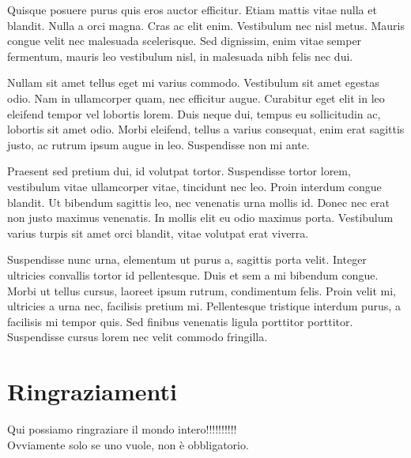 \documentclass[12pt,a4paper,openright,twoside]{report}
\begin{document}
Quisque posuere purus quis eros auctor efficitur. Etiam mattis vitae nulla et blandit. Nulla a orci magna. Cras ac elit enim. Vestibulum nec nisl metus. Mauris congue velit nec malesuada scelerisque. Sed dignissim, enim vitae semper fermentum, mauris leo vestibulum nisl, in malesuada nibh felis nec dui.

Nullam sit amet tellus eget mi varius commodo. Vestibulum sit amet egestas odio. Nam in ullamcorper quam, nec efficitur augue. Curabitur eget elit in leo eleifend tempor vel lobortis lorem. Duis neque dui, tempus eu sollicitudin ac, lobortis sit amet odio. Morbi eleifend, tellus a varius consequat, enim erat sagittis justo, ac rutrum ipsum augue in leo. Suspendisse non mi ante.

Praesent sed pretium dui, id volutpat tortor. Suspendisse tortor lorem, vestibulum vitae ullamcorper vitae, tincidunt nec leo. Proin interdum congue blandit. Ut bibendum sagittis leo, nec venenatis urna mollis id. Donec nec erat non justo maximus venenatis. In mollis elit eu odio maximus porta. Vestibulum varius turpis sit amet orci blandit, vitae volutpat erat viverra.

Suspendisse nunc urna, elementum ut purus a, sagittis porta velit. Integer ultricies convallis tortor id pellentesque. Duis et sem a mi bibendum congue. Morbi ut tellus cursus, laoreet ipsum rutrum, condimentum felis. Proin velit mi, ultricies a urna nec, facilisis pretium mi. Pellentesque tristique interdum purus, a facilisis mi tempor quis. Sed finibus venenatis ligula porttitor porttitor. Suspendisse cursus lorem nec velit commodo fringilla.



\clearpage{\pagestyle{empty}\cleardoublepage}




\rhead[\fancyplain{}{\bfseries \leftmark}]{\fancyplain{}{\bfseries
\thepage}}

\clearpage{\pagestyle{empty}\cleardoublepage}
\chapter*{Ringraziamenti}
\thispagestyle{empty}
Qui possiamo ringraziare il mondo intero!!!!!!!!!!\\
Ovviamente solo se uno vuole, non \`e obbligatorio.
\nocite{*}


\end{document}
